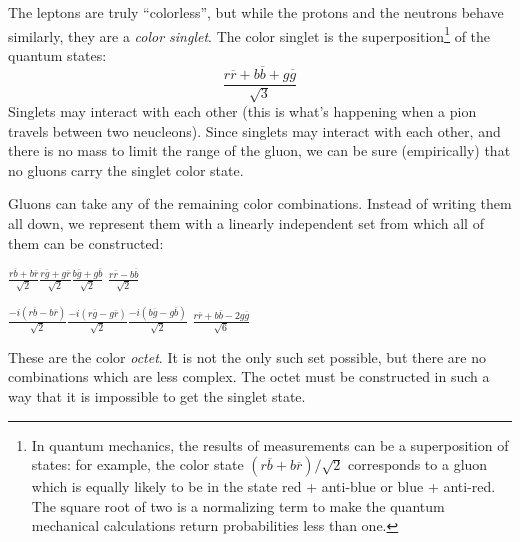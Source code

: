 The leptons are truly ``colorless'', but while the protons and the neutrons behave similarly, they are a \textit{color singlet}. The color singlet is the superposition\footnote{In quantum mechanics, the results of measurements can be a superposition of states: for example, the color state $(r\overline{b} + b\overline{r})/\sqrt{2}$ corresponds to a gluon which is equally likely to be in the state red + anti-blue or blue + anti-red. The square root of two is a normalizing term to make the quantum mechanical calculations return probabilities less than one.} of the quantum states:
\begin{equation}
    \frac{r\overline{r} + b\overline{b} + g\overline{g}}{\sqrt{3}}
\end{equation}
Singlets may interact with each other (this is what's happening when a pion travels between two neucleons). Since singlets may interact with each other, and there is no mass to limit the range of the gluon, we can be sure (empirically) that no gluons carry the singlet color state.

Gluons can take any of the remaining color combinations. Instead of writing them all down, we represent them with a linearly independent set from which all of them can be constructed: 

{\centering

    $\frac{r\overline{b} + b\overline{r}}{\sqrt{2}}$\hspace{1cm}$\frac{r\overline{g} + g\overline{r}}{\sqrt{2}}$\hspace{1cm}$\frac{b\overline{g} + g\overline{b}}{\sqrt{2}}$\hspace{1cm} $\frac{r\overline{r} - b\overline{b}}{\sqrt{2}}$
    
    }

{\centering  

    $\frac{-i(r\overline{b} - b\overline{r})}{\sqrt{2}}$\hspace{1cm}$\frac{-i(r\overline{g} - g\overline{r})}{\sqrt{2}}$\hspace{1cm}$\frac{-i(b\overline{g} - g\overline{b})}{\sqrt{2}}$ \hspace{1cm}$\frac{r\overline{r} + b\overline{b} -2g\overline{g}}{\sqrt{6}}$
    
    }
    
These are the color \textit{octet}. It is not the only such set possible, but there are no combinations which are less complex. The octet must be constructed in such a way that it is impossible to get the singlet state.

